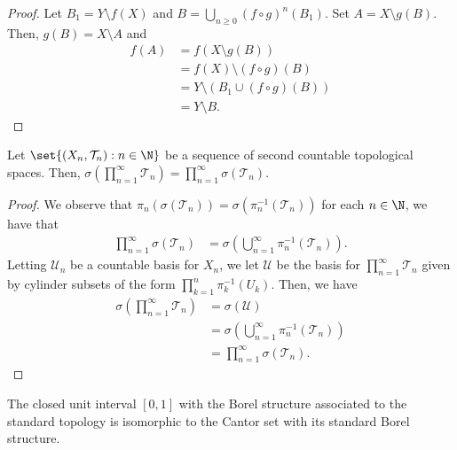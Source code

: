 \documentclass[10pt]{mypackage}
\begin{document}
\begin{proof}
  Let $B_1 = Y\setminus f(X)$ and $B = \bigcup_{n\geq 0}\left( f\circ g \right)^{n}\left(B_1\right)$. Set $A = X\setminus g(B)$. Then, $g(B) = X\setminus A$ and
  \begin{align*}
    f(A) &= f\left( X\setminus g(B) \right)\\
         &= f\left( X \right)\setminus \left( f\circ g \right)(B)\\
         &= Y\setminus \left( B_1\cup \left( f\circ g \right)(B) \right)\\
         &= Y\setminus B.
  \end{align*}
\end{proof}
\begin{lemma}
  Let $\set{\left( X_n,\mathcal{T}_n \right) : n\in \N}$ be a sequence of second countable topological spaces. Then, $ \sigma\left( \prod_{n=1}^{\infty}\mathcal{T}_n \right) = \prod_{n=1}^{\infty}\sigma\left( \mathcal{T}_n \right) $.
\end{lemma}
\begin{proof}
  We observe that $\pi_n\left( \sigma\left( \mathcal{T}_n \right) \right) = \sigma\left( \pi_n^{-1}\left( \mathcal{T}_n \right) \right)$ for each $n\in \N$, we have that
  \begin{align*}
    \prod_{n=1}^{\infty} \sigma\left( \mathcal{T}_n \right) &= \sigma\left( \bigcup_{n=1}^{\infty}\pi_n^{-1}\left( \mathcal{T}_n \right) \right).
  \end{align*}
  Letting $\mathcal{U}_n$ be a countable basis for $X_n$, we let $\mathcal{U}$ be the basis for $\prod_{n=1}^{\infty}\mathcal{T}_n$ given by cylinder subsets of the form $\prod_{k=1}^{n}\pi_k^{-1}\left( U_k \right)$. Then, we have
  \begin{align*}
    \sigma\left( \prod_{n=1}^{\infty}\mathcal{T}_n \right) &= \sigma\left( \mathcal{U} \right)\\
                                                           &= \sigma\left( \bigcup_{n=1}^{\infty}\pi_n^{-1}\left( \mathcal{T}_n \right) \right)\\
                                                           &= \prod_{n=1}^{\infty}\sigma\left( \mathcal{T}_n \right).
  \end{align*}
\end{proof}
\begin{lemma}
  The closed unit interval $\left[ 0,1 \right]$ with the Borel structure associated to the standard topology is isomorphic to the Cantor set with its standard Borel structure.
\end{lemma}
\end{document}
